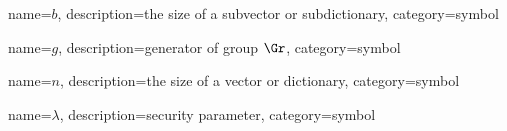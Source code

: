 
\renewcommand{\glossarysection}[2][]{} %
\setlength{\glsdescwidth}{15cm}

\makeglossaries


%
%

{
  name={\ensuremath{b}},%
  description={the size of a subvector or subdictionary},%
  category=symbol%
}


{
  name={\ensuremath{g}},%
  description={generator of group $\Gr$},%
  category=symbol%
}

{
  name={\ensuremath{n}},%
  description={the size of a vector or dictionary},%
  category=symbol%
}

{
  name={\ensuremath{\lambda}},%
  description={security parameter},%
  category=symbol%
}
